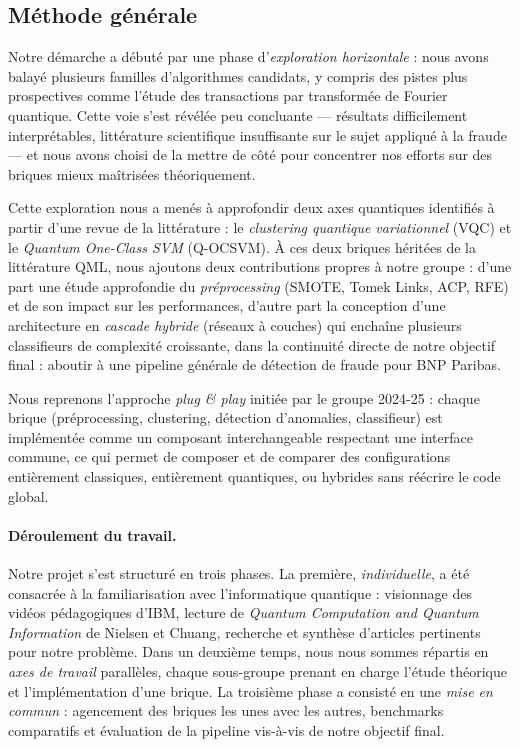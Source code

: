 \documentclass[a4paper]{article}
\begin{document}
\subsection{Méthode générale}

Notre démarche a débuté par une phase d'\emph{exploration horizontale} : nous avons balayé plusieurs familles d'algorithmes candidats, y compris des pistes plus prospectives comme l'étude des transactions par transformée de Fourier quantique. Cette voie s'est révélée peu concluante --- résultats difficilement interprétables, littérature scientifique insuffisante sur le sujet appliqué à la fraude --- et nous avons choisi de la mettre de côté pour concentrer nos efforts sur des briques mieux maîtrisées théoriquement.

Cette exploration nous a menés à approfondir deux axes quantiques identifiés à partir d'une revue de la littérature : le \emph{clustering quantique variationnel} (VQC) et le \emph{Quantum One-Class SVM} (Q-OCSVM). À ces deux briques héritées de la littérature QML, nous ajoutons deux contributions propres à notre groupe : d'une part une étude approfondie du \emph{préprocessing} (SMOTE, Tomek Links, ACP, RFE) et de son impact sur les performances, d'autre part la conception d'une architecture en \emph{cascade hybride} (réseaux à couches) qui enchaîne plusieurs classifieurs de complexité croissante, dans la continuité directe de notre objectif final : aboutir à une pipeline générale de détection de fraude pour BNP Paribas.

Nous reprenons l'approche \emph{plug \& play} initiée par le groupe 2024-25 : chaque brique (préprocessing, clustering, détection d'anomalies, classifieur) est implémentée comme un composant interchangeable respectant une interface commune, ce qui permet de composer et de comparer des configurations entièrement classiques, entièrement quantiques, ou hybrides sans réécrire le code global.

\paragraph{Déroulement du travail.} Notre projet s'est structuré en trois phases. La première, \emph{individuelle}, a été consacrée à la familiarisation avec l'informatique quantique : visionnage des vidéos pédagogiques d'IBM, lecture de \emph{Quantum Computation and Quantum Information} de Nielsen et Chuang, recherche et synthèse d'articles pertinents pour notre problème. Dans un deuxième temps, nous nous sommes répartis en \emph{axes de travail} parallèles, chaque sous-groupe prenant en charge l'étude théorique et l'implémentation d'une brique. La troisième phase a consisté en une \emph{mise en commun} : agencement des briques les unes avec les autres, benchmarks comparatifs et évaluation de la pipeline vis-à-vis de notre objectif final.
\end{document}
